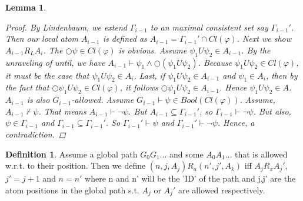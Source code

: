 \documentclass[11pt]{article}
\newtheorem{lemma}[theorem]{Lemma}
\theoremstyle{definition}
\newtheorem{definition}[theorem]{Definition}
\theoremstyle{remark}
\begin{document}
\begin{lemma}
\begin{proof}
        By Lindenbaum, we extend $\Gamma_{i-1}$ to an maximal consistent set say $\Gamma_{i-1}'$. Then our local atom $A_{i-1}$ is defined as 
        $A_{i-1} = \Gamma_{i-1}' \cap Cl(\varphi)$. Next we show $A_{i-1} R_L A_i$. The $\bigcirc \psi \in Cl(\varphi)$ is obvious. Assume $\psi_1 U \psi_2 \in A_{i-1}$. By the unraveling of until, we have
        $A_{i-1} \vdash \psi_1 \land \bigcirc (\psi_1 U \psi_2)$. Because $\psi_1 U \psi_2 \in Cl(\varphi)$, it must be the case that $\psi_1 U \psi_2 \in A_i$. Last, if $\psi_1 U \psi_2 \in A_{i-1}$ and $\psi_1 \in A_i$, then
        by the fact that $\bigcirc \psi_1 U \psi_2  \in Cl(\varphi)$, it follows $\bigcirc \psi_1 U \psi_2 \in A_{i-1}$. Hence $\psi_1 U \psi_2 \in A$. \newline 
        $A_{i-1}$ is also $G_{i-1}$-allowed. Assume $G_{i-1} \vdash \psi \in Bool(Cl(\varphi))$. Assume, $A_{i-1} \nvdash \psi$. That means $A_{i-1} \vdash \neg \psi$. But $A_{i-1} \subseteq \Gamma_{i-1}'$, so $\Gamma_{i-1} \vdash \neg \psi$.
        But also, $\psi \in \Gamma_{i-1}$ and $\Gamma_{i-1} \subseteq \Gamma_{i-1}'$. So $\Gamma_{i-1}' \vdash \psi$ and $\Gamma_{i-1}' \vdash \neg \psi$. Hence, a contradiction.

    \end{proof}
\end{lemma}

\begin{definition}
    
    Assume a global path $G_0G_1...$ and some $A_0A_1...$ that is allowed w.r.t. to their position.
    Then we define $(n, j, A_j ) R_a (n' ,j', A_k)$ iff $A_j R_x A_j'$, $j' = j+1$ and $n = n'$ where n and n' will be the 'ID' of the path
    and j,j' are the atom positions in the global path s.t.  $A_j$ or $A_j'$ are allowed respectively.

\end{definition}
\end{document}
